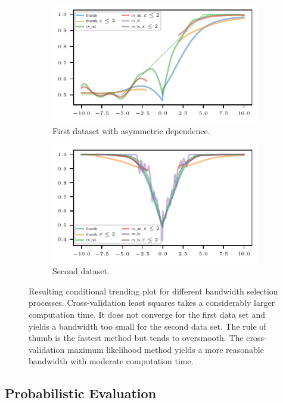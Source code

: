 \begin{figure}
    \centering
    \begin{subfigure}{.48\textwidth}
        \includegraphics{plots/illustrative_examples/cond_prob_plot_bw_asym_butterfly}
        \caption{First dataset with asymmetric dependence.}
    \end{subfigure}
    \begin{subfigure}{.48\textwidth}
        \includegraphics{plots/illustrative_examples/cond_prob_plot_bw_normal}
        \caption{Second dataset. }
    \end{subfigure}
    \caption{Resulting conditional trending plot for different bandwidth selection processes. Cross-validation least squares takes a considerably larger computation time. It does not converge for the first data set and yields a bandwidth too small for the second data set. The rule of thumb is the fastest method but tends to oversmooth. The cross-validation maximum likelihood method yields a more reasonable bandwidth with moderate computation time. }\label{fig:trending-cond-prob-bw}
\end{figure}

\newpage
\subsection{Probabilistic Evaluation}\label{subsec:probabilistic}

